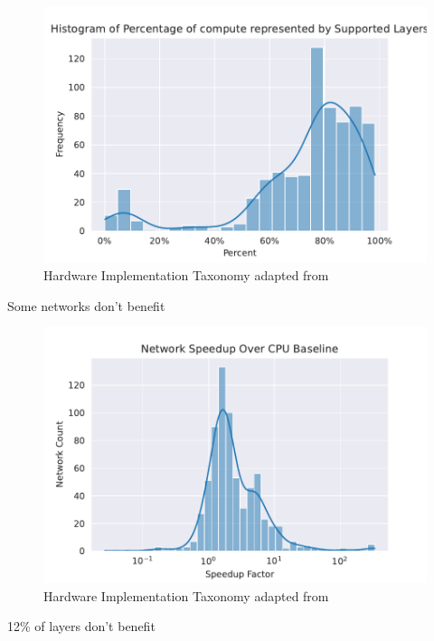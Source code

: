 \begin{figure}[ht]
    \centering
    \includegraphics[scale=0.58]{Plots/overview/percent.pdf}
    \caption{Hardware Implementation Taxonomy adapted from \cite{maestro}}
    \label{fig:hw_taxonomy}
\end{figure}

Some networks don't benefit

\begin{figure}[ht]
    \centering
    \includegraphics[scale=0.58]{Plots/latency/net_speedup.pdf}
    \caption{Hardware Implementation Taxonomy adapted from \cite{maestro}}
    \label{fig:hw_taxonomy}
\end{figure}

12\% of layers don't benefit

